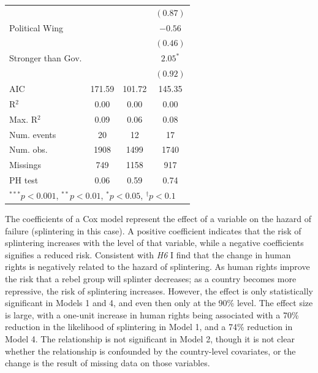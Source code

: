 \documentclass[12pt,]{book}
\let\origtable\table
\let\endorigtable\endtable
\renewenvironment{table}[1][2] {
    \singlespacing
    \expandafter\origtable\expandafter[H]
} {
    \endorigtable
}
\theoremstyle{definition}
\theoremstyle{definition}
\theoremstyle{definition}
\theoremstyle{remark}
\begin{document}
\begin{table}
\begin{center}
\begin{tabular}{l c c c }
                                  &                   &          & $(0.87)$          \\
Political Wing                    &                   &          & $-0.56$           \\
                                  &                   &          & $(0.46)$          \\
Stronger than Gov.                &                   &          & $2.05^{*}$        \\
                                  &                   &          & $(0.92)$          \\
\hline
AIC                               & 171.59            & 101.72   & 145.35            \\
R$^2$                             & 0.00              & 0.00     & 0.00              \\
Max. R$^2$                        & 0.09              & 0.06     & 0.08              \\
Num. events                       & 20                & 12       & 17                \\
Num. obs.                         & 1908              & 1499     & 1740              \\
Missings                          & 749               & 1158     & 917               \\
PH test                           & 0.06              & 0.59     & 0.74              \\
\hline
\multicolumn{4}{l}{\scriptsize{$^{***}p<0.001$, $^{**}p<0.01$, $^*p<0.05$, $^{\dagger}p<0.1$}}
\end{tabular}
\caption{Cox Proportional Hazard Models of Rebel Group Splintering}
\label{tab:survival}
\end{center}
\end{table}

The coefficients of a Cox model represent the effect of a variable on
the hazard of failure (splintering in this case). A positive coefficient
indicates that the risk of splintering increases with the level of that
variable, while a negative coefficients signifies a reduced risk.
Consistent with \emph{H6} I find that the change in human rights is
negatively related to the hazard of splintering. As human rights improve
the risk that a rebel group will splinter decreases; as a country
becomes more repressive, the risk of splintering increases. However, the
effect is only statistically significant in Models 1 and 4, and even
then only at the 90\% level. The effect size is large, with a one-unit
increase in human rights being associated with a 70\% reduction in the
likelihood of splintering in Model 1, and a 74\% reduction in Model 4.
The relationship is not significant in Model 2, though it is not clear
whether the relationship is confounded by the country-level covariates,
or the change is the result of missing data on those variables.
\end{document}
